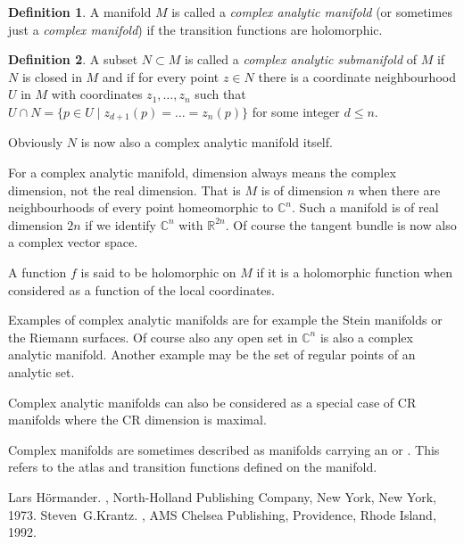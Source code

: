 \documentclass[12pt]{article}
\theoremstyle{theorem}
\theoremstyle{definition}
\newtheorem*{defn}{Definition}
\begin{document}
\begin{defn}
A manifold $M$ is called a {\em complex analytic manifold} (or sometimes just
a {\em complex manifold}) if the transition functions are holomorphic.
\end{defn}

\begin{defn}
A subset $N \subset M$ is called a {\em complex analytic submanifold} of $M$
if $N$ is closed in $M$ and if for every point $z \in N$ there is a coordinate neighbourhood $U$ in $M$ with coordinates $z_1,\ldots,z_n$ such that
$U \cap N = \{ p \in U \mid z_{d+1}(p) = \ldots = z_n(p) \}$ for some integer $d \leq n$. 
\end{defn}

Obviously $N$ is now also a complex analytic manifold itself.

For a complex analytic manifold, dimension always means the complex dimension,
not the real dimension.  That is $M$ is of dimension $n$ when there are neighbourhoods of every point homeomorphic to ${\mathbb{C}}^n$.  Such a manifold is of real dimension $2n$ if we identify ${\mathbb{C}}^n$ with
${\mathbb{R}}^{2n}$.
Of course the tangent bundle is now also a complex vector space.

A function $f$ is said to be holomorphic on $M$ if it is a holomorphic function when considered as a function of the local coordinates.

Examples of complex analytic manifolds are for example the Stein manifolds or the Riemann surfaces.  Of course also any open set in ${\mathbb{C}}^n$ is also a complex analytic manifold.  Another example may be the set of regular points of an analytic set.

Complex analytic manifolds can also be considered as a special case of CR manifolds where the CR dimension is maximal.

Complex manifolds are sometimes described as manifolds carrying an {\em {}} or {\em {}}.  This refers to the atlas and transition functions defined on the manifold.

\begin{thebibliography}{9}
Lars H\"ormander.
{\em {}},
North-Holland Publishing Company, New York, New York, 1973.
Steven~G.\@ Krantz.
{\em {}},
AMS Chelsea Publishing, Providence, Rhode Island, 1992.
\end{thebibliography}
\end{document}
